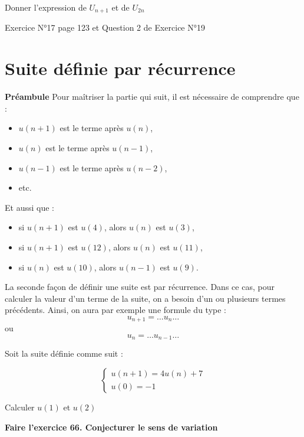 \documentclass[a4paper,12pt]{article}
\begin{document}
Donner l’expression de $U_{n+1}$ et de $U_{2n}$

\trou{\vspace{5em}}{\vspace{5em}}

\begin{tcolorbox}[colback=blue!10!white, colframe=blue!75!black, title=Exercices]
  Exercice N°17 page 123 et Question 2 de Exercice N°19
\end{tcolorbox}

\section*{Suite définie par récurrence}

\textbf{Préambule}
\vspace{1em}
Pour maîtriser la partie qui suit, il est nécessaire de comprendre que : 
\begin{itemize}[noitemsep]
    \item $u(n+1)$ est le terme après $u(n)$,
    \item $u(n)$ est le terme après $u(n-1)$,
    \item $u(n-1)$ est le terme après $u(n-2)$,
    \item etc.
\end{itemize}

Et aussi que :
\begin{itemize}[noitemsep]
    \item si $u(n+1)$ est $u(4)$, alors $u(n)$ est $u(3)$,
    \item si $u(n+1)$ est $u(12)$, alors $u(n)$ est $u(11)$,
    \item si $u(n)$ est $u(10)$, alors $u(n-1)$ est $u(9)$.
\end{itemize}


La seconde façon de définir une suite est par récurrence. Dans ce cas, pour calculer la valeur d’un terme de la suite, on a besoin d’un ou plusieurs termes précédents. Ainsi, on aura par exemple une formule du type :
\[
u_{n+1} = \ldots u_n \ldots
\]
ou
\[
u_n = \ldots u_{n-1} \ldots
\]

\begin{tcolorbox}[colback=blue!10!white, colframe=blue!75!black, title=Exercices]

  Soit la suite définie comme suit : 

  \[
    \left\{
      \begin{array}{ll}
            u(n+1) = 4 u(n) + 7 \\
            u(0) = -1 
        \end{array}
      \right.
    \]

  Calculer $u(1)$ et $u(2)$

  {\vspace{6em}}
  \textbf{Faire l'exercice 66. Conjecturer le sens de variation}
\end{tcolorbox}
\end{document}

